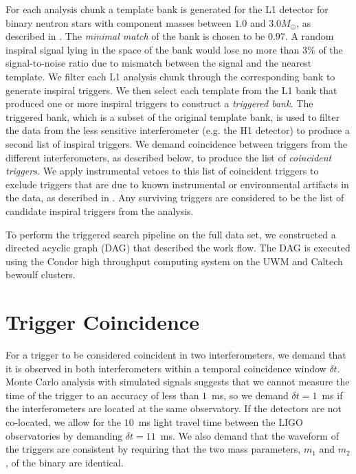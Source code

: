 For each analysis chunk a template bank is generated for the L1 detector for
binary neutron stars with component masses between $1.0$ and $3.0 M_\odot$, as
described in \cite{owensathya}.  The \emph{minimal match} of the bank is
chosen to be $0.97$. A random inspiral signal lying in the space of the bank
would lose no more than $3\%$ of the signal-to-noise ratio due to mismatch
between the signal and the nearest template. We filter each L1 analysis chunk
through the corresponding bank to generate inspiral triggers. We then select
each template from the L1 bank that produced one or more inspiral triggers to
construct a \emph{triggered bank.} The triggered bank, which is a subset of
the original template bank, is used to filter the data from the less sensitive
interferometer (e.g. the H1 detector) to produce a second list of inspiral
triggers. We demand coincidence between triggers from the different
interferometers, as described below, to produce the list of \emph{coincident
triggers.} We apply instrumental vetoes to this list of coincident triggers to
exclude triggers that are due to known instrumental or environmental artifacts
in the data, as described in \cite{gwdawveto}. Any surviving triggers are
considered to be the list of candidate inspiral triggers from the analysis.

To perform the triggered search pipeline on the full data set, we constructed
a directed acyclic graph (DAG) that described the work flow.  The DAG is
executed using the Condor high throughput computing system\cite{condor} on the
UWM and Caltech bewoulf clusters.

\section{Trigger Coincidence}
\label{s:coincidence}

For a trigger to be considered coincident in two interferometers, we demand
that it is observed in both interferometers within a temporal coincidence
window $\delta t$. Monte Carlo analysis with simulated signals suggests that we
cannot measure the time of the trigger to an accuracy of less than $1$~ms, so
we demand $\delta t = 1$~ms if the interferometers are located at the same
observatory. If the detectors are not co-located, we allow for the $10$~ms
light travel time between the LIGO observatories by demanding $\delta t =
11$~ms. We also demand that the waveform of the triggers are consistent by
requiring that the two mass parameters, $m_1$ and $m_2$, of the binary are
identical.

